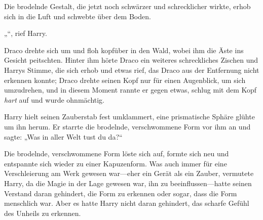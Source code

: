 \begin{em}
Die brodelnde Gestalt, die jetzt noch schwärzer und schrecklicher wirkte, erhob sich in die Luft und schwebte über dem Boden.

„“, rief Harry.

Draco drehte sich um und floh kopfüber in den Wald, wobei ihm die Äste ins Gesicht peitschten. Hinter ihm hörte Draco ein weiteres schreckliches Zischen und Harrys Stimme, die sich erhob und etwas rief, das Draco aus der Entfernung nicht erkennen konnte; Draco drehte seinen Kopf nur für einen Augenblick, um sich umzudrehen, und in diesem Moment rannte er gegen etwas, schlug mit dem Kopf \emph{hart} auf und wurde ohnmächtig.
\end{em}

\later

Harry hielt seinen Zauberstab fest umklammert, eine prismatische Sphäre glühte um ihn herum. Er starrte die brodelnde, verschwommene Form vor ihm an und sagte: „Was in aller Welt tust du da?“

Die brodelnde, verschwommene Form löste sich auf, formte sich neu und entspannte sich wieder zu einer Kapuzenform. Was auch immer für eine Verschleierung am Werk gewesen war—eher ein Gerät als ein Zauber, vermutete Harry, da die Magie in der Lage gewesen war, ihn zu beeinflussen—hatte seinen Verstand daran gehindert, die Form zu erkennen oder sogar, dass die Form menschlich war. Aber es hatte Harry nicht daran gehindert, das scharfe Gefühl des Unheils zu erkennen.

